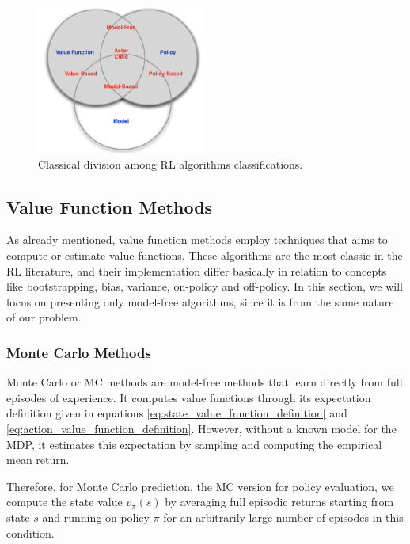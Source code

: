

\begin{figure}[H]
    \centering
    \includegraphics[width=0.5\textwidth]{Chapter2/categorizing_RL.png} 
    \caption{Classical division among RL algorithms classifications.}
    \label{fig:categorizing_RL}
\end{figure}

\subsection{Value Function Methods}

As already mentioned, value function methods employ techniques that aims to compute or estimate value functions. These algorithms are the most classic in the RL literature, and their implementation differ basically in relation to concepts like bootstrapping, bias, variance, on-policy and off-policy. In this section, we will focus on presenting only model-free algorithms, since it is from the same nature of our problem.

\subsubsection{Monte Carlo Methods}

Monte Carlo or MC methods are model-free methods that learn directly from full episodes of experience. It computes value functions through its expectation definition given in equations \ref{eq:state_value_function_definition} and \ref{eq:action_value_function_definition}. However, without a known model for the MDP, it estimates this expectation by sampling and computing the empirical mean return.

Therefore, for Monte Carlo prediction, the MC version for policy evaluation, we compute the state value $v_{\pi}(s)$ by averaging full episodic returns starting from state $s$ and running on policy $\pi$ for an arbitrarily large number of episodes in this condition.

